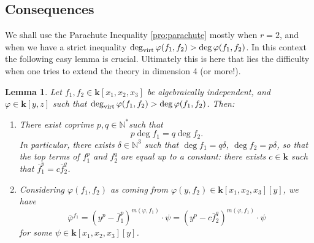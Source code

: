 \documentclass[reqno,oneside,11pt]{amsart}
\theoremstyle{plain}
\newtheorem{lemma}[theorem]{Lemma}
\theoremstyle{definition}
\newcommand{\N}{\mathbb{N}}
\newcommand{\K}{\mathbf{k}}
\renewcommand{\phi}{\varphi}
\newcommand{\dvirt}{\deg_{\text{\rm virt}}}
\newcommand{\topcomp}[2]{\overline{#1}^{#2}}
\begin{document}
\subsection{Consequences}

We shall use the Parachute Inequality \ref{pro:parachute} mostly when $r = 2$, and when we have a strict inequality $\dvirt \phi(f_1,f_2) > \deg \phi(f_1,f_2)$.
In this context the following easy lemma is crucial.
Ultimately this is here that lies the difficulty when one tries to extend the theory in dimension 4 (or more!).

\begin{lemma}
\label{lem:p and q}
Let $f_1,f_2 \in \K[x_1,x_2,x_3]$ be algebraically independent, and $\phi \in \K[y,z]$ such that $\dvirt \phi(f_1,f_2) > \deg \phi(f_1,f_2)$.
Then:
\begin{enumerate}
\item \label{p and q:1} There exist coprime $p,q \in \N^*$such that
$$p \deg f_1 = q \deg f_2.$$
In particular, there exists $\delta \in \N^3$ such that $\deg f_1 = q \delta$,
$\deg f_2 = p\delta$, so that the top terms of $f_1^p$ and $f_2^q$ are equal
up to a constant: there exists $c \in \K$ such that $\bar f_1^p = c \bar
f_2^q$.

\item \label{p and q:2} Considering $\phi(f_1,f_2)$ as coming from $\phi(y,f_2) \in \K[x_1,x_2,x_3][y]$, we have
$$\topcomp{\phi}{f_1} 
= (y^p - \bar f_1^p)^{m(\phi,f_1)}\cdot \psi
= (y^p - c\bar f_2^q)^{m(\phi,f_1)}\cdot \psi$$
for some $\psi \in \K[x_1,x_2,x_3][y]$.
\end{enumerate}
\end{lemma}
\end{document}
